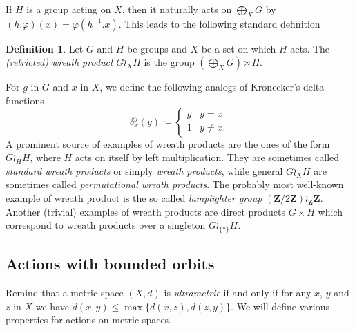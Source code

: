 \documentclass[a4paper]{article}
\theoremstyle{definition}
\newtheorem{defn}[lem]{Definition}
\newcommand*{\field}[1]{\mathbf{#1}}
\newcommand*{\Z}{\field{Z}}
\begin{document}
If $H$ is a group acting on $X$, then it naturally acts on $\bigoplus_XG$
by $(h.\varphi)(x)=\varphi(h^{-1}.x)$.
This leads to the following standard definition
\begin{defn}\label{Def:WreathProd}
Let $G$ and $H$ be groups and $X$ be a set on which $H$ acts.
The \emph{(retricted) wreath product} $G\wr_XH$ is the group $(\bigoplus_XG)\rtimes H$.
\end{defn}
For $g$ in $G$ and $x$ in $X$, we define the following analogs of Kronecker's delta functions
\begin{equation*}
\delta_x^g (y) \coloneqq
\begin{cases}
g & y = x \\
1 & y \neq x.
\end{cases}
\end{equation*}
A prominent  source of examples of wreath products are the ones of the form $G\wr_HH$, where $H$ acts on itself by left multiplication.
They are sometimes called \emph{standard wreath products} or simply \emph{wreath products}, while general $G\wr_XH$ are sometimes called \emph{permutational wreath products}.
The probably most well-known example of wreath product is the so called \emph{lamplighter group} $(\Z/2\Z)\wr_\Z\Z$.
Another (trivial) examples of wreath products are direct products $G\times H$ which correspond to wreath products over a singleton $G\wr_{\{*\}}H$.

%
%
%
%
%
%
%
%
%
%
\subsection{Actions with bounded orbits}
%
%
%
Remind that a metric space $(X,d)$ is \emph{ultrametric} if and only if for any $x$, $y$ and $z$ in $X$ we have $d(x,y)\leq\max\{d(x,z),d(z,y)\}$. We will define various properties for actions on metric spaces.
\end{document}
